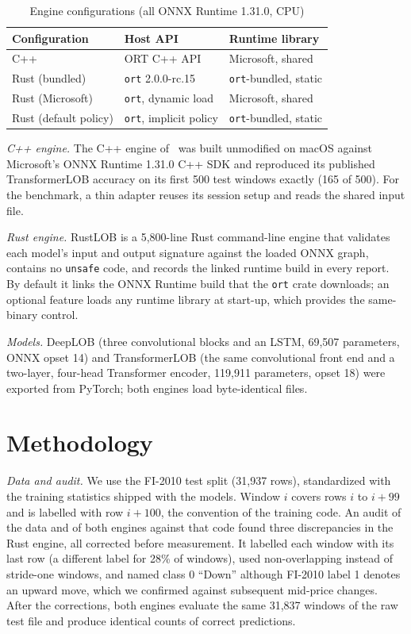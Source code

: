 \documentclass[conference]{IEEEtran}
\begin{document}
\begin{table}[t]
\caption{Engine configurations (all ONNX Runtime 1.31.0, CPU)}
\label{tab:engines}
\centering
\footnotesize
\setlength{\tabcolsep}{3pt}
\begin{tabular}{@{}lll@{}}
\toprule
Configuration & Host API & Runtime library \\
\midrule
C++ & ORT C++ API & Microsoft, shared \\
Rust (bundled) & \texttt{ort} 2.0.0-rc.15 & \texttt{ort}-bundled, static \\
Rust (Microsoft) & \texttt{ort}, dynamic load & Microsoft, shared \\
Rust (default policy) & \texttt{ort}, implicit policy & \texttt{ort}-bundled, static \\
\bottomrule
\end{tabular}
\end{table}

\textit{C++ engine.} The C++ engine of~\cite{prashant2026deeplobhft} was built unmodified on macOS against Microsoft's ONNX Runtime 1.31.0 C++ SDK and reproduced its published TransformerLOB accuracy on its first 500 test windows exactly (165 of 500). For the benchmark, a thin adapter reuses its session setup and reads the shared input file.

\textit{Rust engine.} RustLOB is a 5,800-line Rust command-line engine that validates each model's input and output signature against the loaded ONNX graph, contains no \texttt{unsafe} code, and records the linked runtime build in every report. By default it links the ONNX Runtime build that the \texttt{ort} crate downloads; an optional feature loads any runtime library at start-up, which provides the same-binary control.

\textit{Models.} DeepLOB (three convolutional blocks and an LSTM, 69,507 parameters, ONNX opset 14) and TransformerLOB (the same convolutional front end and a two-layer, four-head Transformer encoder, 119,911 parameters, opset 18) were exported from PyTorch; both engines load byte-identical files.

\section{Methodology}

\textit{Data and audit.} We use the FI-2010 test split (31,937 rows), standardized with the training statistics shipped with the models. Window $i$ covers rows $i$ to $i+99$ and is labelled with row $i+100$, the convention of the training code. An audit of the data and of both engines against that code found three discrepancies in the Rust engine, all corrected before measurement. It labelled each window with its last row (a different label for 28\% of windows), used non-overlapping instead of stride-one windows, and named class 0 ``Down'' although FI-2010 label 1 denotes an upward move, which we confirmed against subsequent mid-price changes. After the corrections, both engines evaluate the same 31,837 windows of the raw test file and produce identical counts of correct predictions.
\end{document}
